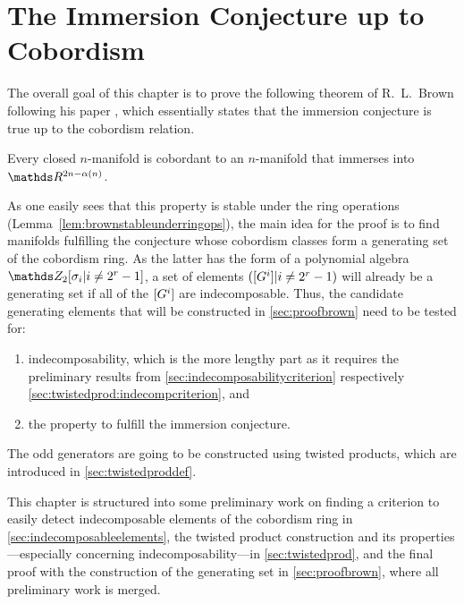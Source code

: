 % 

\chapter{The Immersion Conjecture up to Cobordism}\label{chap:brown}
The overall goal of this chapter is to prove the following theorem of
R.~L.~Brown following his paper \cite{brown},
which essentially states that the immersion conjecture is true up to
the cobordism relation.
\begin{Thm}[Brown]\label{thm:brown}
  Every closed $n$-manifold is cobordant to an $n$-manifold that immerses
  into $\R^{2n-\alpha(n)}$.
\end{Thm}

As one easily sees that this property is stable under
the ring operations (Lemma~\ref{lem:brownstableunderringops}),
the main idea for the proof is to find manifolds
fulfilling the conjecture whose cobordism classes form a generating set
of the cobordism ring.
As the latter has the form of a polynomial algebra
$\Zmod2[\sigma_i|i\neq 2^r-1]$, a set of elements
$([G^{i}]|i\neq2^r-1)$ will already be a generating set if all of the
$[G^{i}]$ are indecomposable.
Thus, the candidate generating elements that will be constructed
in \autoref{sec:proofbrown} need to be tested for:
\begin{enumerate}
\item indecomposability, which is the more lengthy part as it
  requires the preliminary results from
  \autoref{sec:indecomposabilitycriterion} respectively
  \autoref{sec:twistedprod:indecompcriterion}, and
\item the property to fulfill the immersion conjecture.
\end{enumerate}
The odd generators are going to be constructed using twisted
products, which are introduced in \autoref{sec:twistedproddef}.

This chapter is structured into some preliminary work on finding a
criterion to easily detect indecomposable elements of the cobordism
ring in \autoref{sec:indecomposableelements},
the twisted product construction and its properties---especially
concerning indecomposability---in
\autoref{sec:twistedprod}, and the final proof with the construction
of the generating set in \autoref{sec:proofbrown}, where all
preliminary work is merged.

